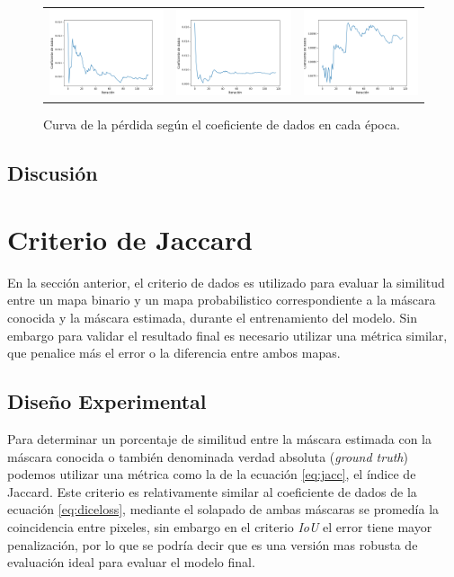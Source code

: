 \begin{figure}[h!]
\begin{tabular}{ccc}
        \includegraphics[width=4cm]{../Plots/dl_epoch_15.png} &
        \includegraphics[width=4cm]{../Plots/dl_epoch_16.png} &
        \includegraphics[width=4cm]{../Plots/dl_epoch_17.png} \\
        
    \end{tabular}
    \caption{Curva de la pérdida según el coeficiente de dados en cada época.}
    \label{fig:dice_loss_epochs}
\end{figure}

\subsection{Discusión}

\section{Criterio de Jaccard}
En la sección anterior, el criterio de dados es utilizado para evaluar la similitud entre un mapa binario y un mapa probabilistico correspondiente a la máscara conocida y la máscara estimada, durante el entrenamiento del modelo. Sin embargo para validar el resultado final es necesario utilizar una métrica similar, que penalice más el error o la diferencia entre ambos mapas.

\subsection{Diseño Experimental}
Para determinar un porcentaje de similitud entre la máscara estimada con la máscara conocida o también denominada verdad absoluta (\emph{ground truth}) podemos utilizar una métrica como la de la ecuación \ref{eq:jacc}, el índice de Jaccard. Este criterio es relativamente similar al coeficiente de dados de la ecuación \ref{eq:diceloss}, mediante el solapado de ambas máscaras se promedía la coincidencia entre pixeles, sin embargo en el criterio \emph{IoU} el error tiene mayor penalización, por lo que se podría decir que es una versión mas robusta de evaluación ideal para evaluar el modelo final.

